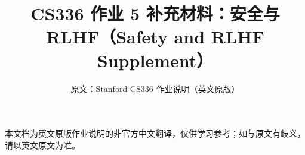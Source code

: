 \documentclass[11pt,a4paper]{ctexart}
\title{\textbf{CS336 作业 5 补充材料：安全与 RLHF（Safety and RLHF Supplement）}}
\author{原文：Stanford CS336 作业说明（英文原版）}
\date{}
\begin{document}
\maketitle
\begin{center}\small
本文档为英文原版作业说明的非官方中文翻译，仅供学习参考；如与原文有歧义，请以英文原文为准。
\end{center}
\tableofcontents
\clearpage

\end{document}
